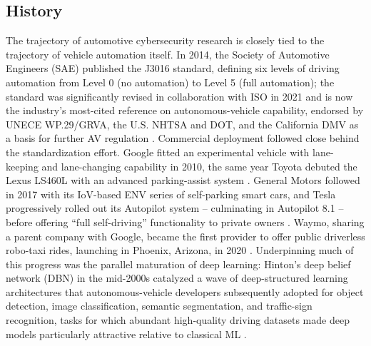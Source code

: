 \documentclass[journal]{IEEEtran}
\begin{document}
	\subsection{History}
	
	The trajectory of automotive cybersecurity research is closely tied to
	the trajectory of vehicle automation itself. In 2014, the Society of
	Automotive Engineers (SAE) published the J3016 standard, defining six
	levels of driving automation from Level 0 (no automation) to Level 5
	(full automation); the standard was significantly revised in
	collaboration with ISO in 2021 and is now the industry's most-cited
	reference on autonomous-vehicle capability, endorsed by UNECE
	WP.29/GRVA, the U.S. NHTSA and DOT, and the California DMV as a basis for
	further AV regulation \cite{ref1,ref2}. Commercial deployment followed
	close behind the standardization effort. Google fitted an experimental
	vehicle with lane-keeping and lane-changing capability in 2010, the same
	year Toyota debuted the Lexus LS460L with an advanced parking-assist
	system \cite{ref2}. General Motors followed in 2017 with its IoV-based
	ENV series of self-parking smart cars, and Tesla progressively rolled out
	its Autopilot system -- culminating in Autopilot 8.1 -- before offering
	``full self-driving'' functionality to private owners \cite{ref2}.
	Waymo, sharing a parent company with Google, became the first provider
	to offer public driverless robo-taxi rides, launching in Phoenix,
	Arizona, in 2020 \cite{ref1}. Underpinning much of this progress was the
	parallel maturation of deep learning: Hinton's deep belief network (DBN)
	in the mid-2000s catalyzed a wave of deep-structured learning
	architectures that autonomous-vehicle developers subsequently adopted for
	object detection, image classification, semantic segmentation, and
	traffic-sign recognition, tasks for which abundant high-quality driving
	datasets made deep models particularly attractive relative to classical
	ML \cite{ref2}.
	
\end{document}
